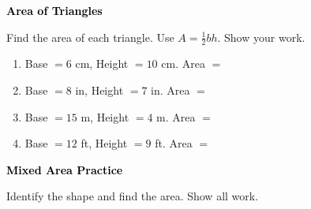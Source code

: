 \documentclass[12pt, letterpaper, fleqn]{article}
\newcommand{\blank}{\underline{\hspace{2.2cm}}}
\begin{document}
\newpage

\begin{tcolorbox}[colback=black!10]
\large\textcolor{black}{\textbf{Area of Triangles}}
\end{tcolorbox}

\noindent
Find the area of each triangle. Use $A = \frac{1}{2}bh$. Show your work.

\vspace{3mm}

\begin{enumerate}[itemsep=2.2cm, leftmargin=0.6cm]

\item Base $= 6$ cm, Height $= 10$ cm. \quad Area $=$ \blank

\vspace{1.5cm}

\item Base $= 8$ in, Height $= 7$ in. \quad Area $=$ \blank

\vspace{1.5cm}

\item Base $= 15$ m, Height $= 4$ m. \quad Area $=$ \blank

\vspace{1.5cm}

\item Base $= 12$ ft, Height $= 9$ ft. \quad Area $=$ \blank

\vspace{1.5cm}

\end{enumerate}

\newpage

\begin{tcolorbox}[colback=black!10]
\large\textcolor{black}{\textbf{Mixed Area Practice}}
\end{tcolorbox}

\noindent
Identify the shape and find the area. Show all work.

\vspace{3mm}
\end{document}
